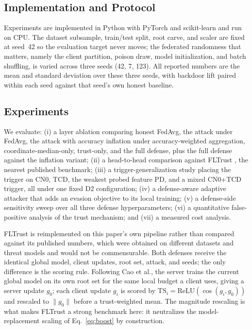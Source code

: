 \documentclass[journal]{IEEEtran}
\begin{document}
\subsection{Implementation and Protocol}
Experiments are implemented in Python with PyTorch and scikit-learn and run on CPU. The dataset subsample, train/test split, root carve, and scaler are fixed at seed~42 so the evaluation target never moves; the federated randomness that matters, namely the client partition, poison draw, model initialization, and batch shuffling, is varied across three seeds (42, 7, 123). All reported numbers are the mean and standard deviation over these three seeds, with backdoor lift paired within each seed against that seed's own honest baseline.

\subsection{Experiments}
We evaluate: (i) a layer ablation comparing honest FedAvg, the attack under FedAvg, the attack with accuracy inflation under accuracy-weighted aggregation, coordinate-median-only, trust-only, and the full defense, plus the full defense against the inflation variant; (ii) a head-to-head comparison against FLTrust \cite{cao2021fltrust}, the nearest published benchmark; (iii) a trigger-generalization study placing the trigger on CN0, TCD, the weakest probed feature PD, and a mixed CN0+TCD trigger, all under one fixed D2 configuration; (iv) a defense-aware adaptive attacker that adds an evasion objective to its local training; (v) a defense-side sensitivity sweep over all three defense hyperparameters; (vi) a quantitative false-positive analysis of the trust mechanism; and (vii) a measured cost analysis.

FLTrust is reimplemented on this paper's own pipeline rather than compared against its published numbers, which were obtained on different datasets and threat models and would not be commensurable. Both defenses receive the identical global model, client updates, root set, attack, and seeds; the only difference is the scoring rule. Following Cao et al., the server trains the current global model on its own root set for the same local budget a client uses, giving a server update $g_0$; each client update $g_i$ is scored by $\mathrm{TS}_i = \mathrm{ReLU}(\cos(g_i, g_0))$ and rescaled to $\lVert g_0 \rVert$ before a trust-weighted mean. The magnitude rescaling is what makes FLTrust a strong benchmark here: it neutralizes the model-replacement scaling of Eq.~\ref{eq:boost} by construction.
\end{document}

